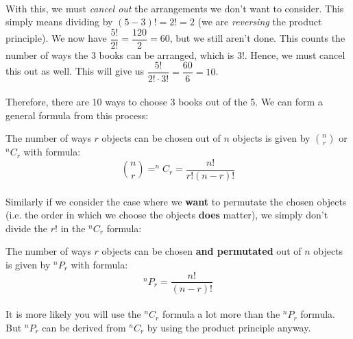 \documentclass[12pt, a4paper, titlepage, twoside]{article}
\begin{document}
	\paragraph{}
	With this, we must \textit{cancel out} the arrangements we don't want to consider. This simply means dividing by $(5-3)! = 2! = 2$ 
	(we are \textit{reversing} the product principle). We now have $\dfrac{5!}{2!} = \dfrac{120}{2} = 60$, but we still aren't done. 
	This counts the number of ways the $3$ books can be arranged, which is $3!$. Hence, we must cancel this out as well. This will give 
	us $\dfrac{5!}{2! \cdot 3!} = \dfrac{60}{6} = 10$.
	
	\paragraph{}
	Therefore, there are 10 ways to choose 3 books out of the 5. We can form a general formula from this process:\\
	
	\begin{kp}
		The number of ways $r$ objects can be chosen out of $n$ objects is given by ${n \choose r}$ or $^nC_r$ with formula:
		\[{n \choose r} = ^nC_r = \dfrac{n!}{r! (n-r)!}\]
	\end{kp}
	
	\paragraph{}
	Similarly if we consider the case where we \textbf{want} to permutate the chosen objects (i.e. the order in which we choose the objects
	\textbf{does} matter), we simply don't divide the $r!$ in the $^nC_r$ formula:\\
	
	\begin{kp}
		The number of ways $r$ objects can be chosen \textbf{and permutated} out of $n$ objects is given by $^nP_r$ with formula:
		\[^nP_r = \dfrac{n!}{(n-r)!}\]
	\end{kp}
	
	\paragraph{}
	It is more likely you will use the $^nC_r$ formula a lot more than the $^nP_r$ formula. But $^nP_r$ can be derived from $^nC_r$
	by using the product principle anyway.\\
	
\end{document}
